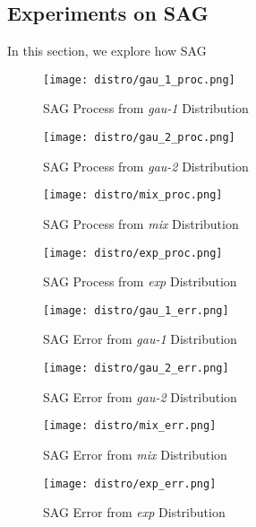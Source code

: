 \subsection{Experiments on SAG}

In this section, we explore how SAG

\graphicspath{{Figures/Stepsize_adapt/SAG/}{./}} 

\begin{figure}[H]
    \centering
	\texttt{[image: distro/gau\_1\_proc.png]}
	\caption{SAG Process from \textit{gau-1} Distribution}
\end{figure}

\begin{figure}[H]
    \centering
	\texttt{[image: distro/gau\_2\_proc.png]}
	\caption{SAG Process from  \textit{gau-2} Distribution}
\end{figure}

\begin{figure}[H]
    \centering
	\texttt{[image: distro/mix\_proc.png]}
	\caption{SAG Process from \textit{mix} Distribution}
\end{figure}

\begin{figure}[H]
    \centering
	\texttt{[image: distro/exp\_proc.png]}
	\caption{SAG Process from \textit{exp} Distribution}
\end{figure}

\begin{figure}[H]
    \centering
	\texttt{[image: distro/gau\_1\_err.png]}
	\caption{SAG Error from \textit{gau-1} Distribution}
\end{figure}

\begin{figure}[H]
    \centering
	\texttt{[image: distro/gau\_2\_err.png]}
	\caption{SAG Error from  \textit{gau-2} Distribution}
\end{figure}

\begin{figure}[H]
    \centering
	\texttt{[image: distro/mix\_err.png]}
	\caption{SAG Error from \textit{mix} Distribution}
\end{figure}

\begin{figure}[H]
    \centering
	\texttt{[image: distro/exp\_err.png]}
	\caption{SAG Error from \textit{exp} Distribution}
\end{figure}


